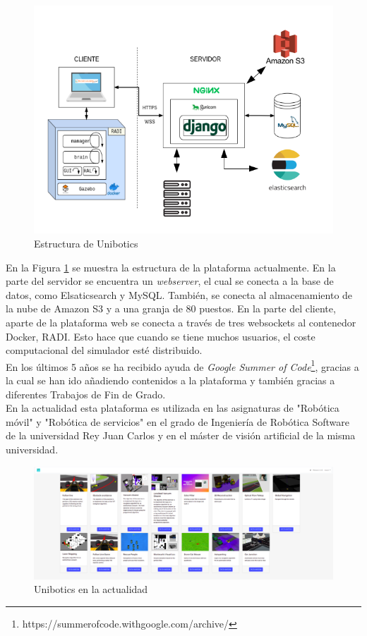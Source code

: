 \begin{figure}[H]
    \centering
    \includegraphics[width=12cm, keepaspectratio]{img/infraestructura.png}
    \caption{Estructura de Unibotics}
    \label{fig:infra}
\end{figure}

En la Figura \ref{fig:infra} se muestra la estructura de la plataforma actualmente. En la parte del servidor se encuentra un \textit{webserver}, el cual se conecta a la base de datos, como Elsaticsearch y MySQL. También, se conecta al almacenamiento de la nube de Amazon S3 y a una granja de 80 puestos. En la parte del cliente, aparte de la plataforma web se conecta a través de tres websockets al contenedor Docker, RADI. Esto hace que cuando se tiene muchos usuarios, el coste computacional del simulador esté distribuido.\\

En los últimos 5 años se ha recibido ayuda de \textit{Google Summer of Code}\footnote{https://summerofcode.withgoogle.com/archive/}, gracias a la cual se han ido añadiendo contenidos a la plataforma y también gracias a diferentes Trabajos de Fin de Grado.\\

En la actualidad esta plataforma es utilizada en las asignaturas de "Robótica móvil" y "Robótica de servicios" en el grado de Ingeniería de Robótica Software de la universidad Rey Juan Carlos y en el máster de visión artificial de la misma universidad.

\begin{figure}[H]
    \centering
    \includegraphics[width=18cm, keepaspectratio]{img/unibotics.png}
    \caption{Unibotics en la actualidad}
    \label{fig:unibotics}
\end{figure}
\newpage
